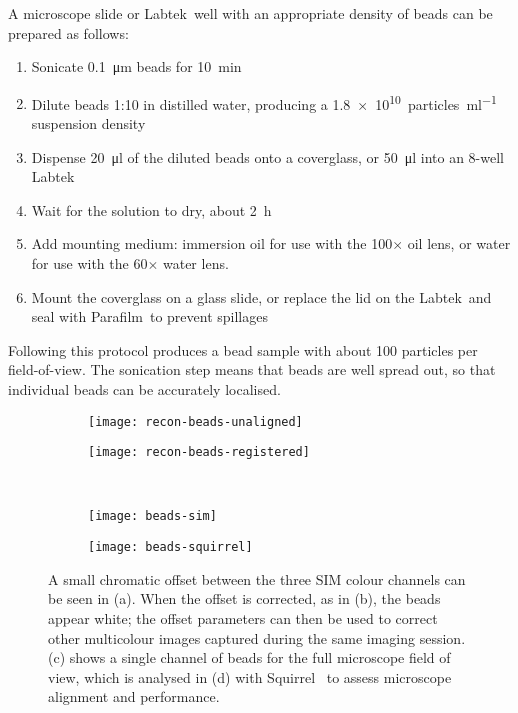 A microscope slide or Labtek\texttrademark\ well with an appropriate density of beads can be prepared as follows:
\begin{enumerate}
	\item Sonicate \SI{0.1}{\micro\metre} beads for \SI{10}{\minute}
	\item Dilute beads 1:10 in distilled water, producing a \SI{1.8e10}{particles\per\milli\litre} suspension density
	\item Dispense \SI{20}{\micro\litre} of the diluted beads onto a coverglass, or \SI{50}{\micro\litre} into an 8-well Labtek
	\item Wait for the solution to dry, about \SI{2}{\hour}
	\item Add mounting medium: immersion oil for use with the 100$\times$ oil lens, or water for use with the 60$\times$ water lens.
	\item Mount the coverglass on a glass slide, or replace the lid on the Labtek\texttrademark\ and seal with Parafilm\texttrademark\  to prevent spillages
\end{enumerate}

Following this protocol produces a bead sample with about 100 particles per field-of-view.
The sonication step means that beads are well spread out, so that individual beads can be accurately localised.

\begin{figure}[p]
\centering
\begin{subfigure}[b]{0.49\textwidth}
	\texttt{[image: recon-beads-unaligned]}
	\caption{}\label{fig:recon-beads-unaligned}
\end{subfigure}
\hfill
\begin{subfigure}[b]{0.49\textwidth}
	\texttt{[image: recon-beads-registered]}
	\caption{}\label{fig:recon-beads-registered}
\end{subfigure}

~\newline
\begin{subfigure}[b]{0.49\textwidth}
	\texttt{[image: beads-sim]}
	\caption{}\label{fig:beads-full-fov}
\end{subfigure}
\hfill
\begin{subfigure}[b]{0.49\textwidth}
	\texttt{[image: beads-squirrel]}
	\caption{}\label{fig:beads-squirrel}
\end{subfigure}
\caption[LAG SIM: Multicolour alignment beads are used for correcting chromatic offset]{A small chromatic offset between the three SIM colour channels can be seen in (a). When the offset is corrected, as in (b), the beads appear white; the offset parameters can then be used to correct other multicolour images captured during the same imaging session. (c) shows a single channel of beads for the full microscope field of view, which is analysed in (d) with Squirrel~\cite{culley2018quantitative} to assess microscope alignment and performance. }
\label{fig:recon-beads}
\end{figure}
\afterpage{\clearpage}

